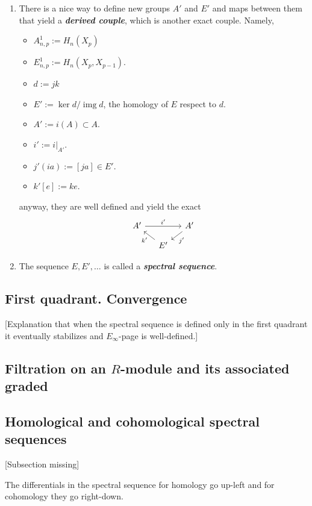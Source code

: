 \begin{remark}
\begin{defn}
\begin{enumerate}
	\item There is a nice way to define new groups $A'$ and $E'$ and maps between them that yield a \textit{\textbf{derived couple}}, which is another exact couple.	Namely,
		\begin{itemize}
			\item $A^1_{n,p}:=H_n(X_p)$
			\item $E^1_{n,p}:=H_n(X_p,X_{p-1})$.
			\item $d:=jk$
			\item $E':=\ker d/\operatorname{img}d$, the homology of $E$ respect to $d$.
			\item $A':=i(A)\subset A$.
			\item $i':=i|_{A'}$.
			\item $j'(ia):=[ja]\in E'$.
			\item $k'[e]:=ke$.
		\end{itemize}
	anyway, they are well defined and yield the exact
	\[\begin{tikzcd}[column sep=small,row sep=small]
		A'\arrow[rr,"i'"]&&A'\arrow[dl,"j'"]\\
		&E'\arrow[ul,"k'"]
	\end{tikzcd}\]

	\item The sequence $E,E',\ldots$ is called a \textit{\textbf{spectral sequence}}.
\end{enumerate}

\subsection{First quadrant. Convergence}

[Explanation that when the spectral sequence is defined only in the first quadrant it eventually stabilizes and $E_{\infty}$-page is well-defined.]

\subsection{Filtration on an \texorpdfstring{$R$}{R}-module and its associated graded}

\subsection{Homological and cohomological spectral sequences}

[Subsection missing]

\begin{remark}
	The differentials in the spectral sequence for homology go up-left and for cohomology they go right-down.
\end{remark}


\end{defn}
\end{remark}
